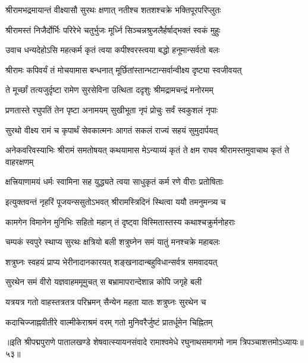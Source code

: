 \twolineshloka
{श्रीरामभद्रमायान्तं वीक्ष्यासौ सुरथः क्षणात्}
{नतीश्च शतशश्चक्रे भक्तिपूरपरिप्लुतः}%

\twolineshloka
{श्रीरामस्तं निजैर्दोर्भिः परिरेभे चतुर्भुजः}
{मूर्ध्नि सिञ्चन्नश्रुजलैर्हर्षाद्भक्तं स्वकं मुहुः}%

\twolineshloka
{उवाच धन्यदेहोऽसि महत्कर्म कृतं त्वया}
{कपीश्वरस्त्वया बद्धो हनूमान्सर्वतो बलः}%

\twolineshloka
{श्रीरामः कपिवर्यं तं मोचयामास बन्धनात्}
{मूर्छितांस्तान्भटान्सर्वान्वीक्ष्य दृष्ट्या स्वजीवयत्}%

\twolineshloka
{ते मूर्च्छां तत्यजुर्दृष्टा रामेण सुरसेविना}
{उत्थिता ददृशुः श्रीमद्रामचन्द्रं मनोरमम्}%

\twolineshloka
{प्रणतास्ते रघुपतिं तेन पृष्टा अनामयम्}
{सुखीभूता नृपं प्रोचुः सर्वं स्वकुशलं नृपाः}%

\twolineshloka
{सुरथो वीक्ष्य रामं च कृपार्थं सेवकात्मनः}
{आगतं सकलं राज्यं सहयं सुमुदार्पयत्}%

\threelineshloka
{अनेकवरिवस्याभिः श्रीरामं समतोषयत्}
{कथयामास मेऽन्याय्यं कृतं ते क्षम राघव}
{श्रीरामस्तमुवाचाथ कृतं ते वाहरक्षणम्}%

\twolineshloka
{क्षत्त्रियाणामयं धर्मः स्वामिना सह युद्ध्यते}
{त्वया साधुकृतं कर्म रणे वीराः प्रतोषिताः}%

\twolineshloka
{इत्युक्तवन्तं नृहरिं पूजयन्ससुतोऽभवत्}
{श्रीरामस्त्रिदिनं स्थित्वा ययौ तमनुमन्त्र्य च}%

\twolineshloka
{कामगेन विमानेन मुनिभिः सहितो महान्}
{तं दृष्ट्वा विस्मितास्तस्य कथाश्चक्रुर्मनोहराः}%

\twolineshloka
{चम्पकं स्वपुरे स्थाप्य सुरथः क्षत्रियो बली}
{शत्रुघ्नेन समं यातुं मनश्चक्रे महाबलः}%

\twolineshloka
{शत्रुघ्नः स्वहयं प्राप्य भेरीनादानकारयत्}
{शङ्खनादान्बहुविधान्सर्वत्र समवादयत्}%

\twolineshloka
{सुरथेन समं वीरो यज्ञवाहममूमुचत्}
{स बभ्रामापरान्देशान्न कोपि जगृहे बली}%

\twolineshloka
{यत्रयत्र गतो वाहस्तत्रतत्र परिभ्रमन्}
{सैन्येन महता यातः शत्रुघ्नः सुरथेन च}%

\twolineshloka
{कदाचिज्जाह्नवीतीरे वाल्मीकेराश्रमं वरम्}
{गतो मुनिवरैर्जुष्टं प्रातर्धूमेन चिह्नितम्}%

{॥इति श्रीपद्मपुराणे पातालखण्डे शेषवात्स्यायनसंवादे रामाश्वमेधे रघुनाथसमागमो नाम त्रिपञ्चाशत्तमोऽध्यायः॥५३॥}



